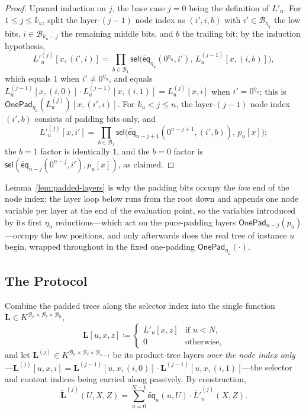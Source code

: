 \documentclass{article}
\theoremstyle{definition}
\newcommand*{\mle}{\widetilde}
\newcommand{\eq}{\mathsf{eq}}
\newcommand{\BB}{\mathcal{B}}
\newcommand{\sel}{\textsf{sel}}
\begin{document}
\begin{proof}
Upward induction on $j$, the base case $j = 0$ being the definition of $L'_u$. For $1 \leq j \leq k_u$, split the layer-$(j - 1)$ node index as $(i', i, b)$ with $i' \in \BB_{\eta_u}$ the low bits, $i \in \BB_{k_u - j}$ the remaining middle bits, and $b$ the trailing bit; by the induction hypothesis,
\[
  L'^{(j)}_u[x, (i', i)] = \prod_{b \in \BB_1} \sel\bigl( \mle{\eq}_{\eta_u}(0^{\eta_u}, i'),\, L^{(j - 1)}_u[x, (i, b)] \bigr),
\]
which equals $1$ when $i' \neq 0^{\eta_u}$, and equals $L^{(j - 1)}_u[x, (i, 0)] \cdot L^{(j - 1)}_u[x, (i, 1)] = L^{(j)}_u[x, i]$ when $i' = 0^{\eta_u}$; this is $\textsf{OnePad}_{\eta_u}(L^{(j)}_u)[x, (i', i)]$. For $k_u < j \leq n$, the layer-$(j - 1)$ node index $(i', b)$ consists of padding bits only, and
\[
  L'^{(j)}_u[x, i'] = \prod_{b \in \BB_1} \sel\bigl( \mle{\eq}_{n - j + 1}(0^{n - j + 1}, (i', b)),\, p_u[x] \bigr);
\]
the $b = 1$ factor is identically $1$, and the $b = 0$ factor is $\sel(\mle{\eq}_{n - j}(0^{n - j}, i'), p_u[x])$, as claimed.
\end{proof}

Lemma~\ref{lem:padded-layers} is why the padding bits occupy the \emph{low} end of the node index: the layer loop below runs from the root down and appends one node variable per layer at the end of the evaluation point, so the variables introduced by its first $\eta_u$ reductions---which act on the pure-padding layers $\textsf{OnePad}_{n - j}(p_u)$---occupy the low positions, and only afterwards does the real tree of instance $u$ begin, wrapped throughout in the fixed one-padding $\textsf{OnePad}_{\eta_u}(\cdot)$.

\subsection{The Protocol}
\label{app:padded-prodcheck-protocol}

Combine the padded trees along the selector index into the single function $\mathbf{L} \in K^{\BB_\kappa \times \BB_\ell \times \BB_n}$,
\[
  \mathbf{L}[u, x, z] \coloneqq \begin{cases} L'_u[x, z] & \text{if } u < N, \\ 0 & \text{otherwise}, \end{cases}
\]
and let $\mathbf{L}^{(j)} \in K^{\BB_\kappa \times \BB_\ell \times \BB_{n - j}}$ be its product-tree layers \emph{over the node index only}---$\mathbf{L}^{(j)}[u, x, i] = \mathbf{L}^{(j - 1)}[u, x, (i, 0)] \cdot \mathbf{L}^{(j - 1)}[u, x, (i, 1)]$---the selector and content indices being carried along passively. By construction,
\begin{equation}
  \mle{\mathbf{L}}^{(j)}(U, X, Z) = \sum_{u = 0}^{N - 1} \mle{\eq}_\kappa(u, U) \cdot \mle{L'}^{(j)}_u(X, Z).
  \label{eq:combined-layers}
\end{equation}
\end{document}
